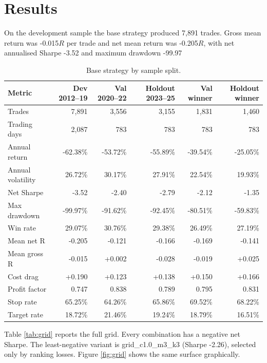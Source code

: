 \documentclass[11pt,a4paper]{article}
\begin{document}
\section{Results}
On the development sample the base strategy produced 7,891 trades. Gross mean return was -0.015$R$ per trade and net mean return was -0.205$R$, with net annualised Sharpe -3.52 and maximum drawdown -99.97%

\begin{table}[htbp]
\centering
\footnotesize
\setlength{\tabcolsep}{4pt}
\caption{Base strategy by sample split.}
\label{tab:splits}
\begin{tabular}{lrrrrr}
\toprule
Metric & Dev 2012--19 & Val 2020--22 & Holdout 2023--25 & Val winner & Holdout winner \\
\midrule
Trades & 7,891 & 3,556 & 3,155 & 1,831 & 1,460 \\
Trading days & 2,087 & 783 & 783 & 783 & 783 \\
Annual return & -62.38\% & -53.72\% & -55.89\% & -39.54\% & -25.05\% \\
Annual volatility & 26.72\% & 30.17\% & 27.91\% & 22.54\% & 19.93\% \\
Net Sharpe & -3.52 & -2.40 & -2.79 & -2.12 & -1.35 \\
Max drawdown & -99.97\% & -91.62\% & -92.45\% & -80.51\% & -59.83\% \\
Win rate & 29.07\% & 30.76\% & 29.38\% & 26.49\% & 27.19\% \\
Mean net R & -0.205 & -0.121 & -0.166 & -0.169 & -0.141 \\
Mean gross R & -0.015 & +0.002 & -0.028 & -0.019 & +0.025 \\
Cost drag & +0.190 & +0.123 & +0.138 & +0.150 & +0.166 \\
Profit factor & 0.747 & 0.838 & 0.789 & 0.795 & 0.831 \\
Stop rate & 65.25\% & 64.26\% & 65.86\% & 69.52\% & 68.22\% \\
Target rate & 18.72\% & 21.46\% & 19.24\% & 18.79\% & 16.51\% \\
\bottomrule
\end{tabular}
\end{table}
Table \ref{tab:grid} reports the full grid. Every combination has a negative net Sharpe. The least-negative variant is grid\_c1.0\_m3\_k3 (Sharpe -2.26), selected only by ranking losses. Figure \ref{fig:grid} shows the same surface graphically.
\end{document}
